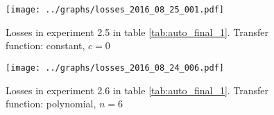       \begin{figure}[!h]
      \centering
      \texttt{[image: ../graphs/losses\_2016\_08\_25\_001.pdf]}
      \caption{Losses in experiment 2.5 in table \ref{tab:auto_final_1}. Transfer function: constant, $c=0$}
      \label{fig:alternate}
      \end{figure}

      \begin{figure}[!h]
      \centering
      \texttt{[image: ../graphs/losses\_2016\_08\_24\_006.pdf]}
      \caption{Losses in experiment 2.6 in table \ref{tab:auto_final_1}. Transfer function: polynomial, $n=6$}
      \label{fig:alternate}
      \end{figure}
